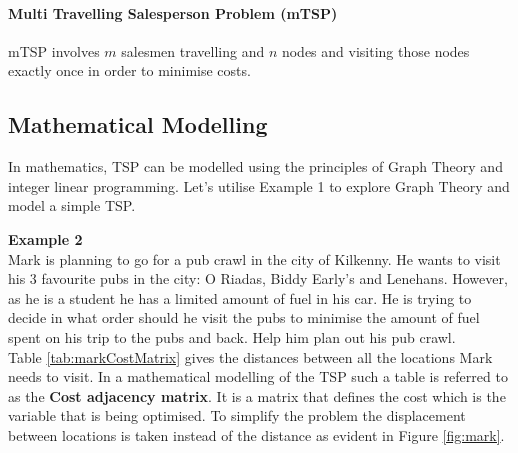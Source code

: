 \documentclass[a4paper]{article}
\begin{document}
\paragraph*{Multi Travelling Salesperson Problem (mTSP)} mTSP involves $m$ salesmen travelling and $n$ nodes and visiting those nodes exactly once in order to minimise costs.

\subsection{Mathematical Modelling}
In mathematics, TSP can be modelled using the principles of Graph Theory and integer linear programming. Let's utilise Example 1 to explore Graph Theory and model a simple TSP.
\begin{displayquote}
    \textbf{Example 2}\\
    Mark is planning to go for a pub crawl in the city of Kilkenny. He wants to visit his 3 favourite pubs in the city: O Riadas, Biddy Early's and Lenehans. However, as he is a student he has a limited amount of fuel in his car. He is trying to decide in what order should he visit the pubs to minimise the amount of fuel spent on his trip to the pubs and back. Help him plan out his pub crawl. \\
    Table \ref{tab:markCostMatrix} gives the distances between all the locations Mark needs to visit. In a mathematical modelling of the TSP such a table is referred to as the \textbf{Cost adjacency matrix}. It is a matrix that defines the cost which is the variable that is being optimised. To simplify the problem the displacement between locations is taken instead of the distance as evident in Figure \ref{fig:mark}.


\end{displayquote}
\end{document}
